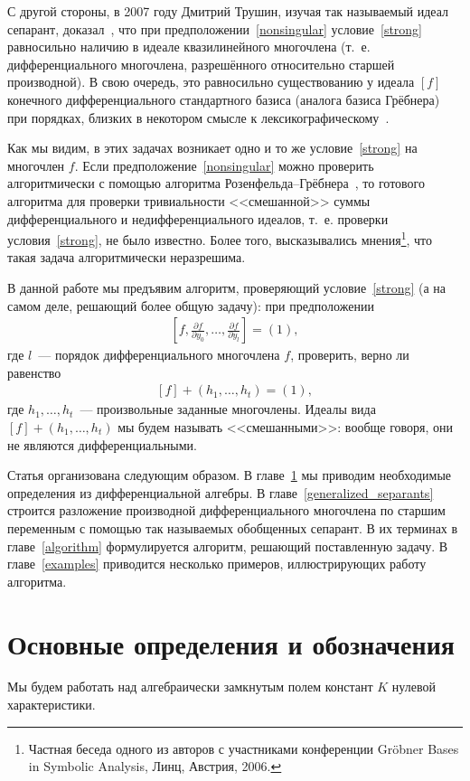 \documentclass[11pt]{article}
\theoremstyle{plain1}
\theoremstyle{plain2}
\theoremstyle{plain}
\theoremstyle{plain3}
\theoremstyle{definition}
\theoremstyle{remark}
\begin{document}
С другой стороны, в 2007 году Дмитрий Трушин, изучая так называемый идеал сепарант, доказал~\cite{Trushin},
что при предположении~\eqref{nonsingular} условие~\eqref{strong} равносильно наличию в идеале квазилинейного многочлена
(т.~е. дифференциального многочлена, разрешённого относительно старшей производной).
В свою очередь, это равносильно существованию у идеала $[f]$ конечного дифференциального стандартного базиса (аналога базиса Грёбнера)
при порядках, близких в некотором смысле к лексикографическому~\cite{Zobnin}.

Как мы видим, в этих задачах возникает одно и то же условие~\eqref{strong} на многочлен $f$.
Если предположение~\eqref{nonsingular} можно проверить алгоритмически с помощью алгоритма Розенфельда--Грёбнера~\cite{BLOP, Sit},
то готового алгоритма для проверки тривиальности <<смешанной>> суммы дифференциального и недифференциального идеалов, т.~е. проверки условия~\eqref{strong}, не было известно.
Более того, высказывались мнения\footnote{Частная беседа одного из авторов с участниками конференции Gr\"obner Bases in Symbolic Analysis, Линц, Австрия, 2006.}, что такая задача алгоритмически неразрешима.

В данной работе мы предъявим алгоритм, проверяющий условие~\eqref{strong} (а на самом деле, решающий более общую задачу):
при предположении
\begin{gather}
\left[f, \frac{\partial f}{\partial y_0}, \ldots, \frac{\partial f}{\partial y_l} \right] = (1),
\end{gather}
где $l$~--- порядок дифференциального многочлена $f$,
проверить, верно ли равенство
\begin{gather}
\label{strong_general}
[f] + (h_1, \ldots, h_t) = (1),
\end{gather}
где $h_1, \ldots, h_t$~--- произвольные заданные многочлены.
Идеалы вида $[f] + (h_1, \ldots, h_t)$ мы будем называть <<смешанными>>: вообще говоря, они не являются дифференциальными.

Статья организована следующим образом. В главе~\ref{preliminaries} мы приводим необходимые определения из дифференциальной алгебры.
В главе~\ref{generalized_separants} строится разложение производной дифференциального многочлена по старшим переменным
с помощью так называемых обобщенных сепарант. В их терминах в главе~\ref{algorithm} формулируется алгоритм,
решающий поставленную задачу. В главе~\ref{examples} приводится несколько примеров, иллюстрирующих работу алгоритма.



\section{Основные определения и обозначения}
\label{preliminaries}
Мы будем работать над алгебраически замкнутым полем констант ${K}$ нулевой характеристики.
\end{document}
